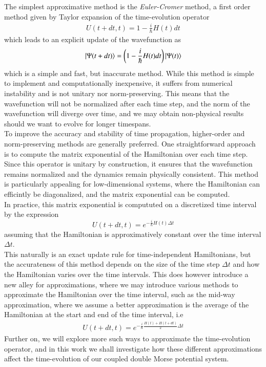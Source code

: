\documentclass{subfiles}
\begin{document}
The simplest approximative method is the \emph{Euler-Cromer} method, a first order method given by Taylor expansion of the time-evolution operator
\begin{align}
    U(t + dt, t) = 1 - \frac{i}{\hbar}H(t)dt\label{eq:euler_cromer}
\end{align}
which leads to an explicit update of the wavefunction as 
\begin{align*}
    \ket{\Psi(t + dt)} = \bigg(1 - \frac{i}{\hbar}H(t)dt\bigg)\ket{\Psi(t)}
\end{align*}
which is a simple and fast, but inaccurate method. While this method is simple to implement and computationally inexpensive, it suffers from numerical instability and is not unitary nor norm-preserving. This means that the wavefunction will not be normalized after each time step, and the norm of the wavefunction will diverge over time, and we may obtain non-physical results should we want to evolve for longer timespans. \\ 
To improve the accuracy and stability of time propagation, higher-order and norm-preserving methods are generally preferred. One straightforward approach is to compute the matrix exponential of the Hamiltonian over each time step. Since this operator is unitary by construction, it ensures that the wavefunction remains normalized and the dynamics remain physically consistent. This method is particularly appealing for low-dimensional systems, where the Hamiltonian can efficintly be diagonalized, and the matrix exponential can be computed. \\

In practice, this matrix exponential is compututed on a discretized time interval by the expression
\begin{equation}
    U(t + dt, t) = e^{-\frac{i}{\hbar}H(t)\Delta t}\label{eq:numerical_time_evolution_operator}
\end{equation}
assuming that the Hamiltonian is approximatively constant over the time interval $\Delta t$. \\

This naturally is an exact update rule for time-independent Hamiltonians, but the accurateness of this method depends on the size of the time step $\Delta t$ and how the Hamiltonian varies over the time intervals. This does however introduce a new alley for approximations, where we may introduce various methods to approximate the Hamiltonian over the time interval, such as the mid-way approximation, where we assume a better approximation is the average of the Hamiltonian at the start and end of the time interval, i.e
\begin{align*}
    U(t + dt, t) = e^{-\frac{i}{\hbar}\frac{H(t) + H(t + dt)}{2}\Delta t}
\end{align*}
Further on, we will explore more such ways to approximate the time-evolution operator, and in this work we shall investigate how these different approximations affect the time-evolution of our coupled double Morse potential system. \\ 
\end{document}
